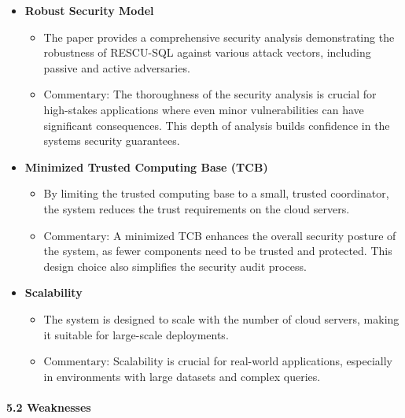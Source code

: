 \documentclass[
]{article}
\begin{document}
\begin{itemize}
\item
  \textbf{Robust Security Model}

  \begin{itemize}
  \item
    The paper provides a comprehensive security analysis demonstrating
    the robustness of RESCU-SQL against various attack vectors,
    including passive and active adversaries.
  \item
    \(\boxed{\text{Commentary}}\): The thoroughness of the security
    analysis is crucial for high-stakes applications where even minor
    vulnerabilities can have significant consequences. This depth of
    analysis builds confidence in the system\textquotesingle s security
    guarantees.
  \end{itemize}
\item
  \textbf{Minimized Trusted Computing Base (TCB)}

  \begin{itemize}
  \item
    By limiting the trusted computing base to a small, trusted
    coordinator, the system reduces the trust requirements on the cloud
    servers.
  \item
    \(\boxed{\text{Commentary}}\): A minimized TCB enhances the overall
    security posture of the system, as fewer components need to be
    trusted and protected. This design choice also simplifies the
    security audit process.
  \end{itemize}
\item
  \textbf{Scalability}

  \begin{itemize}
  \item
    The system is designed to scale with the number of cloud servers,
    making it suitable for large-scale deployments.
  \item
    \(\boxed{\text{Commentary}}\): Scalability is crucial for real-world
    applications, especially in environments with large datasets and
    complex queries.
  \end{itemize}
\end{itemize}

\paragraph{5.2 Weaknesses}\label{52--weaknesses}
\end{document}
